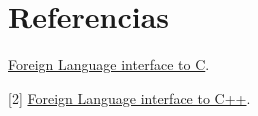 \documentclass[a4paper]{article}
\begin{document}
\section{Referencias}
\begin{flushleft}
[1] \href{http://www.swi-prolog.org/pldoc/man?section=foreign}{Foreign Language interface to C}.

[2] \href{http://www.swi-prolog.org/pldoc/doc_for?object=section('packages/pl2cpp.html')}{Foreign Language interface to C++}.\\
\end{flushleft}
\end{document}
